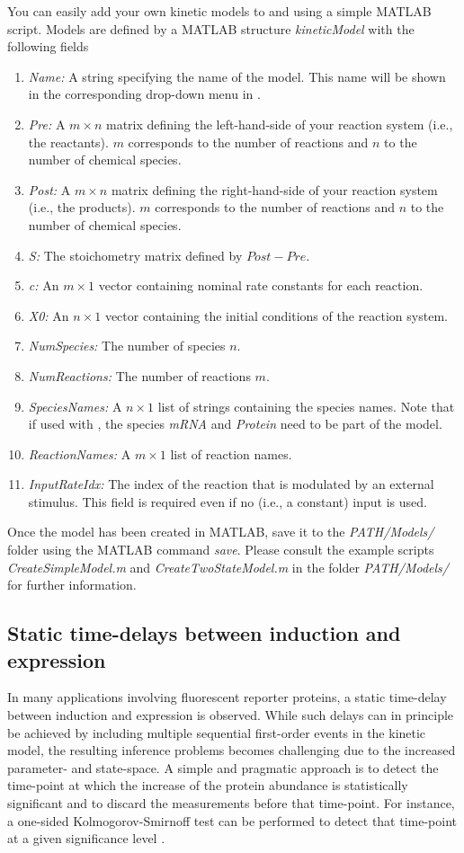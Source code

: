 \documentclass[a4paper, 9pt]{scrartcl}
\begin{document}
You can easily add your own kinetic models to \DPP and \GuiDPP using a simple MATLAB script. Models are defined by a MATLAB structure \textit{kineticModel} with the following fields
\begin{enumerate}
	\item \textit{Name:} A string specifying the name of the model. This name will be shown in the corresponding drop-down menu in \GuiDPP.
	\item \textit{Pre:} A $m\times n$ matrix defining the left-hand-side of your reaction system (i.e., the reactants). $m$ corresponds to the number of reactions and $n$ to the number of chemical species.
	\item \textit{Post:}  A $m\times n$ matrix defining the right-hand-side of your reaction system (i.e., the products). $m$ corresponds to the number of reactions and $n$ to the number of chemical species.
	\item \textit{S:} The stoichometry matrix defined by $Post-Pre$.
	\item \textit{c:} An $m \times 1$ vector containing nominal rate constants for each reaction.
	\item \textit{X0:} An $n\times 1$ vector containing the initial conditions of the reaction system.
	\item \textit{NumSpecies:} The number of species $n$.
	\item \textit{NumReactions:} The number of reactions $m$.
	\item \textit{SpeciesNames:} A $n\times1$ list of strings containing the species names. Note that if used with \GuiDPP, the species \textit{mRNA} and \textit{Protein} need to be part of the model.
	\item \textit{ReactionNames:} A $m\times1$ list of reaction names.
	\item \textit{InputRateIdx:} The index of the reaction that is modulated by an external stimulus. This field is required even if no (i.e., a constant) input is used.
\end{enumerate}
Once the model has been created in MATLAB, save it to the \textit{PATH/Models/} folder using the MATLAB command \textit{save}. Please consult the example scripts \textit{CreateSimpleModel.m} and \textit{CreateTwoStateModel.m} in the folder \textit{PATH/Models/} for further information.

\subsection{Static time-delays between induction and expression} In many applications involving fluorescent reporter proteins, a static time-delay between induction and expression is observed. While such delays can in principle be achieved by including multiple sequential first-order events in the kinetic model, the resulting inference problems becomes challenging due to the increased parameter- and state-space. A simple and pragmatic approach is to detect the time-point at which the increase of the protein abundance is statistically significant and to discard the measurements before that time-point. For instance, a one-sided Kolmogorov-Smirnoff test can be performed to detect that time-point at a given significance level \cite{Zechner2013}.
\end{document}
